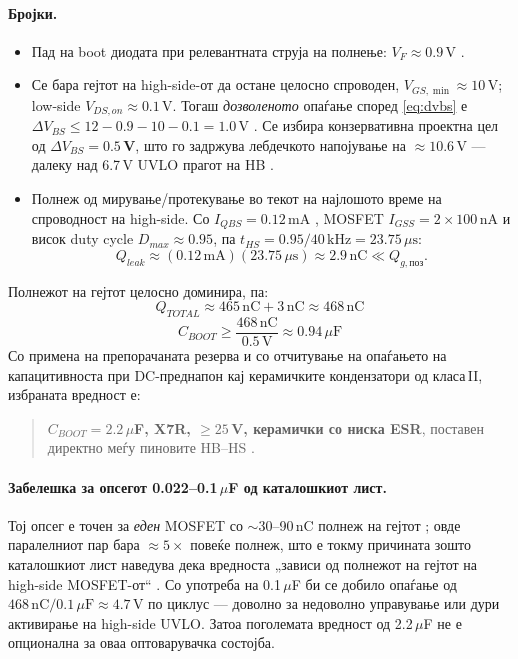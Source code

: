 \documentclass[11pt,a4paper]{article}
\newcommand{\eng}[1]{\textenglish{#1}}
\begin{document}
\paragraph{Бројки.}
\begin{itemize}
  \item Пад на \eng{boot} диодата при релевантната струја на полнење: $V_F \approx 0.9$\,V \cite{ref3}.
  \item Се бара гејтот на \eng{high-side}-от да остане целосно спроводен, $V_{GS,\min} \approx 10$\,V; \eng{low-side} $V_{DS,on}\approx 0.1$\,V. Тогаш \emph{дозволеното} опаѓање според \eqref{eq:dvbs} е $\Delta V_{BS} \le 12 - 0.9 - 10 - 0.1 = 1.0\,\mathrm{V}$ \cite{ref6}. Се избира конзервативна проектна цел од \textbf{$\Delta V_{BS}=0.5$\,V}, што го задржува лебдечкото напојување на $\approx 10.6$\,V --- далеку над 6.7\,V UVLO прагот на HB \cite{ref3}.
  \item Полнеж од мирување/протекување во текот на најлошото време на спроводност на \eng{high-side}. Со $I_{QBS}=0.12$\,mA \cite{ref3}, MOSFET $I_{GSS}=2\times 100$\,nA \cite{ref1} и висок \eng{duty cycle} $D_{max}\approx 0.95$, па $t_{HS}=0.95/40\,\mathrm{kHz}=23.75\,\mu\mathrm{s}$:
  \begin{equation}
  Q_{leak} \approx (0.12\,\mathrm{mA})(23.75\,\mu\mathrm{s}) \approx 2.9\,\mathrm{nC} \ll Q_{g,\text{поз}}.
  \end{equation}
\end{itemize}
Полнежот на гејтот целосно доминира, па:
\begin{equation}
Q_{TOTAL} \approx 465\,\mathrm{nC} + 3\,\mathrm{nC} \approx 468\,\mathrm{nC}
\end{equation}
\begin{equation}
\boxed{\,C_{BOOT} \ge \dfrac{468\,\mathrm{nC}}{0.5\,\mathrm{V}} \approx 0.94\,\mu\mathrm{F}\,}
\end{equation}
Со примена на препорачаната резерва и со отчитување на опаѓањето на капацитивноста при DC-преднапон кај керамичките кондензатори од класа\,II, избраната вредност е:
\begin{quote}
\textbf{$C_{BOOT} = 2.2\,\mu$F, X7R, $\ge 25$\,V, керамички со ниска ESR}, поставен директно меѓу пиновите HB--HS \cite{ref3,ref9}.
\end{quote}

\paragraph{Забелешка за опсегот 0.022--0.1\,$\mu$F од каталошкиот лист.} Тој опсег е точен за \emph{еден} MOSFET со $\sim 30$--90\,nC полнеж на гејтот \cite{ref3}; овде паралелниот пар бара $\approx 5\times$ повеќе полнеж, што е токму причината зошто каталошкиот лист наведува дека вредноста „зависи од полнежот на гејтот на \eng{high-side} MOSFET-от“ \cite{ref3}. Со употреба на 0.1\,$\mu$F би се добило опаѓање од $468\,\mathrm{nC}/0.1\,\mu\mathrm{F} \approx 4.7$\,V по циклус --- доволно за недоволно управување или дури активирање на \eng{high-side} UVLO. Затоа поголемата вредност од 2.2\,$\mu$F не е опционална за оваа оптоварувачка состојба.
\end{document}
